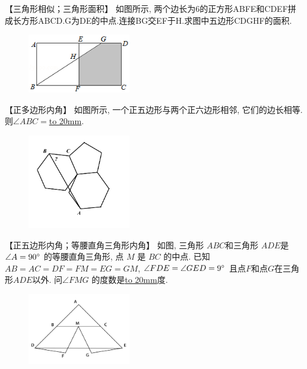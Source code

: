 \item {
    【三角形相似；三角形面积】
    {如图所示, 两个边长为6的正方形ABFE和CDEF拼成长方形ABCD.G为DE的中点.连接BG交EF于H.求图中五边形CDGHF的面积.} 
    \begin{figure}[H] 
        \centering
        \includegraphics[width=0.4\textwidth]{./pics/Chapter_2/13.png}
    \end{figure}
    \vspace{1cm}
}

\item {
    【正多边形内角】
    {如图所示, 一个正五边形与两个正六边形相邻, 它们的边长相等. 则$\angle ABC = $\underline{\hbox to 20mm{}}.} 
    \begin{figure}[H] 
        \centering
        \includegraphics[width=0.4\textwidth]{./pics/Chapter_2/7.png}
    \end{figure}
    \vspace{1cm}
}

\item {
    【正五边形内角；等腰直角三角形内角】
    如图, 三角形 $ABC$和三角形 $ADE$是 $\angle A=90\degree$ 的等腰直角三角形, 点 $M$ 是 $BC$ 的中点. 已知$AB=AC=DF=FM=EG=GM$, $\angle FDE = \angle GED=9\degree$ 且点$F$和点$G$在三角形$ADE$以外. 问$\angle FMG$ 的度数是\underline{\hbox to 20mm{}}度. 
    \begin{figure}[H] 
        \centering
        \includegraphics[width=0.4\textwidth]{./pics/Chapter_2/8.png}
    \end{figure}
    \vspace{1cm}
}


